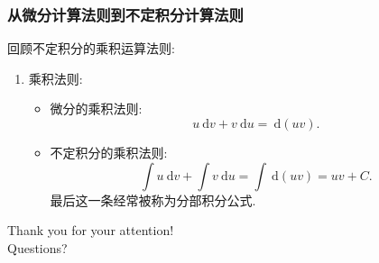 \documentclass[
10pt,
aspectratio=43,
]{beamer}
\begin{document}
\begin{frame}
	\frametitle{从微分计算法则到不定积分计算法则}
	回顾不定积分的乘积运算法则:\pause
	\begin{block}{}
		\begin{enumerate}
			\item 乘积法则:
			      \begin{itemize}
				      \item \pause 微分的乘积法则:
				            $$
					            u\mathrm{~d}v+v\mathrm{~d}u =\mathrm{~d}(uv).
				            $$
				      \item \pause 不定积分的乘积法则:
				            $$
					            \int u\mathrm{~d}v+\int v\mathrm{~d}u=\int\mathrm{~d}(uv) = uv + C.
				            $$
				            \pause 最后这一条经常被称为分部积分公式.
			      \end{itemize}
		\end{enumerate}
	\end{block}
\end{frame}

\begin{frame}[plain]
	\vfill
	\centering
	{
		\centering \Huge \color{white} Thank you for your attention!\\[10pt]Questions?\\
	}
	\vfill
\end{frame}
\end{document}
